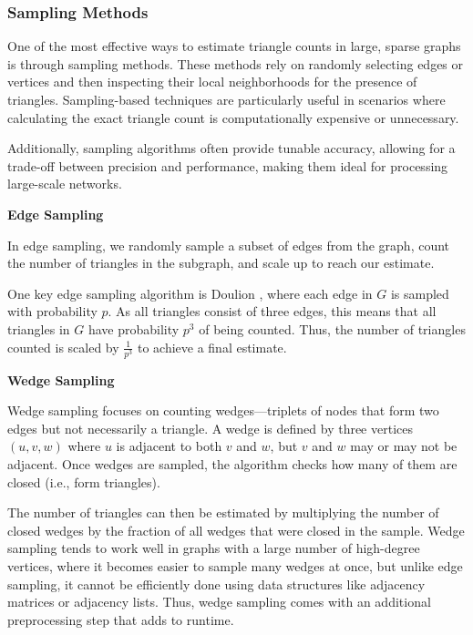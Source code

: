 \documentclass[12pt]{article}
\newcommand{\subsubsubsection}[1]{
  \vspace{1em} %
  \noindent\textbf{#1} %
  \vspace{0.5em} %
}
\begin{document}
\subsubsection{Sampling Methods}

One of the most effective ways to estimate triangle counts in large, sparse graphs is through sampling methods.
These methods rely on randomly selecting edges or vertices and then inspecting their local neighborhoods for the presence of triangles.
Sampling-based techniques are particularly useful in scenarios where calculating the exact triangle count is computationally expensive or unnecessary.

Additionally, sampling algorithms often provide tunable accuracy, allowing for a trade-off between precision and performance, making them ideal for processing large-scale networks.

\subsubsubsection{Edge Sampling}

In edge sampling, we randomly sample a subset of edges from the graph, count the number of triangles in the subgraph, and scale up to reach our estimate.

One key edge sampling algorithm is Doulion \cite{tsourakakis_doulion_2009}, where each edge in $G$ is sampled with probability $p$.
As all triangles consist of three edges, this means that all triangles in $G$ have probability $p^3$ of being counted.
Thus, the number of triangles counted is scaled by $\frac{1}{p^3}$ to achieve a final estimate.

\subsubsubsection{Wedge Sampling}

Wedge sampling \cite{seshadhri_triadic_2013} focuses on counting wedges—triplets of nodes that form two edges but not necessarily a triangle.
A wedge is defined by three vertices $(u, v, w)$ where $u$ is adjacent to both $v$ and $w$, but $v$ and $w$ may or may not be adjacent.
Once wedges are sampled, the algorithm checks how many of them are closed (i.e., form triangles).

The number of triangles can then be estimated by multiplying the number of closed wedges by the fraction of all wedges that were closed in the sample.
Wedge sampling tends to work well in graphs with a large number of high-degree vertices, where it becomes easier to sample many wedges at once, but unlike edge sampling, it cannot be efficiently done using data structures like adjacency matrices or adjacency lists.
Thus, wedge sampling comes with an additional preprocessing step that adds to runtime.

\newpage


\end{document}
